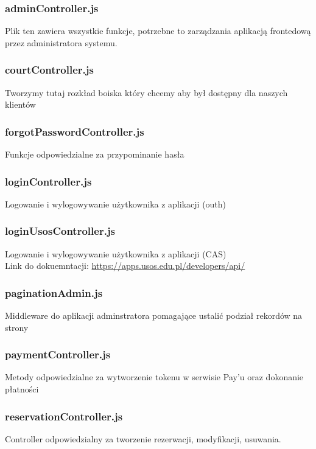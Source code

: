 \documentclass[titlepage]{article}
\begin{document}
\subsubsection{adminController.js}
Plik ten zawiera wszystkie funkcje, potrzebne to zarządzania aplikacją frontedową przez administratora systemu. 

\subsubsection{courtController.js}
Tworzymy tutaj rozkład boiska który chcemy aby był dostępny dla naszych klientów

\subsubsection{forgotPasswordController.js}
Funkcje odpowiedzialne za przypominanie hasła

\subsubsection{loginController.js}
Logowanie i wylogowywanie użytkownika z aplikacji (outh)

\subsubsection{loginUsosController.js}
Logowanie i wylogowywanie użytkownika z aplikacji (CAS) \\
Link do dokuemntacji: \url{https://apps.usos.edu.pl/developers/api/}

\subsubsection{paginationAdmin.js}
Middleware do aplikacji adminstratora pomagające ustalić podział rekordów na strony

\subsubsection{paymentController.js}
Metody odpowiedzialne za wytworzenie tokenu w serwisie Pay'u oraz dokonanie płatności

\subsubsection{reservationController.js}
Controller odpowiedzialny za tworzenie rezerwacji, modyfikacji, usuwania.
\end{document}
